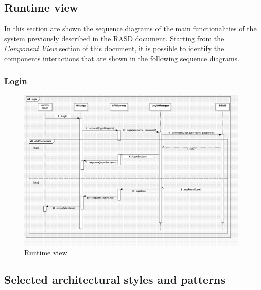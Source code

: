 \begin{itemize}
\subsection{Runtime view}
In this section are shown the sequence diagrams of the main functionalities of the system previously described in the RASD document. Starting from the \textit{Component View} section of this document, it is possible to identify the components interactions that are shown in the following sequence diagrams.
\subsubsection*{Login}
\begin{figure}[H]
    \centering
    \includegraphics[width=\textwidth]{Diagrams/LoginSD.jpg}
    \caption{Runtime view}
    \label{fig:runtime_view}
\end{figure}
\subsection{Selected architectural styles and patterns}

\end{itemize}
